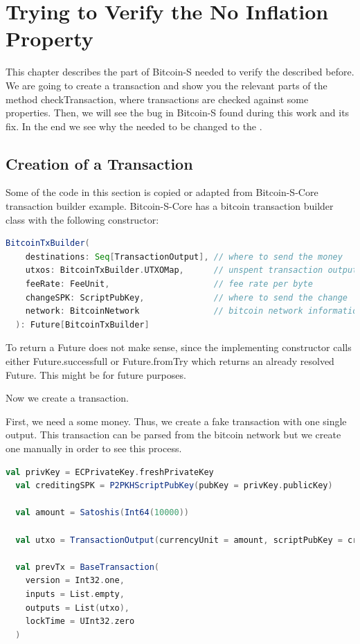 \chapter{Trying to Verify the No Inflation Property}
\label{chap:verify_check}

This chapter describes the part of Bitcoin-S needed to verify the  described before.
We are going to create a transaction and show you the relevant parts of the method checkTransaction, where transactions are checked against some properties.
Then, we will see the bug in Bitcoin-S found during this work and its fix.
In the end we see why the  needed to be changed to the .


\section{Creation of a Transaction}

Some of the code in this section is copied or adapted from Bitcoin-S-Core transaction builder example.\cite{BitcoinSCore:txbuilderexample}
Bitcoin-S-Core has a bitcoin transaction builder class with the following constructor:
\begin{lstlisting}[language=scala]
  BitcoinTxBuilder(
    destinations: Seq[TransactionOutput], // where to send the money
    utxos: BitcoinTxBuilder.UTXOMap,      // unspent transaction outputs
    feeRate: FeeUnit,                     // fee rate per byte
    changeSPK: ScriptPubKey,              // where to send the change
    network: BitcoinNetwork               // bitcoin network information
  ): Future[BitcoinTxBuilder]
\end{lstlisting}

To return a Future does not make sense, since the implementing constructor calls either Future.successfull or Future.fromTry which returns an already resolved Future.
This might be for future purposes.

Now we create a transaction.

First, we need a some money.
Thus, we create a fake transaction with one single output.
This transaction can be parsed from the bitcoin network but we create one manually in order to see this process.
\begin{lstlisting}[language=scala]
  val privKey = ECPrivateKey.freshPrivateKey
  val creditingSPK = P2PKHScriptPubKey(pubKey = privKey.publicKey)

  val amount = Satoshis(Int64(10000))

  val utxo = TransactionOutput(currencyUnit = amount, scriptPubKey = creditingSPK)

  val prevTx = BaseTransaction(
    version = Int32.one,
    inputs = List.empty,
    outputs = List(utxo),
    lockTime = UInt32.zero
  )
\end{lstlisting}

